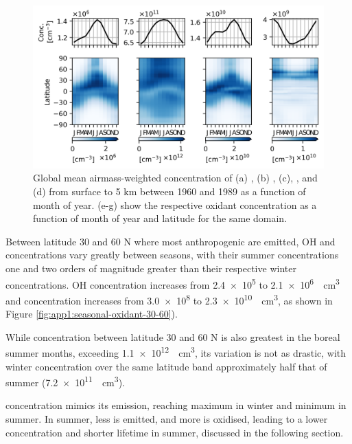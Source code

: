 \begin{figure}
    \centering
    \includegraphics{Chapter4/Figs/seasonal_oxidant_pothole.png}
    \caption[Mean concentration of , , , and  from surface to 5 km between 1960 and 1989]{Global mean airmass-weighted concentration of (a) , (b) , (c), , and (d)  from surface to 5 km between 1960 and 1989 as a function of month of year. (e-g) show the respective oxidant concentration as a function of month of year and latitude for the same domain.}
    \label{fig:ch4:seasonal-oxidants}
\end{figure}

Between latitude 30 and 60 \textdegree N where most anthropogenic  are emitted, OH and  concentrations vary greatly between seasons, with their summer concentrations one and two orders of magnitude greater than their respective winter concentrations. OH concentration increases from \num{2.4e5} to \qty{2.1e6}{\per\cubic\cm} and  concentration increases from \num{3.0e8} to \qty{2.3e10}{\per\cubic\cm}, as shown in Figure \ref{fig:app1:seasonal-oxidant-30-60}). 

While  concentration between latitude 30 and 60 \textdegree N is also greatest in the boreal summer months, exceeding \qty{1.1e12}{\per\cubic\cm}, its variation is not as drastic, with winter concentration over the same latitude band approximately half that of summer (\qty{7.2e11}{\per\cubic\cm}).

 concentration mimics its emission, reaching maximum in winter and minimum in summer. In summer, less  is emitted, and more is oxidised, leading to a lower concentration and shorter lifetime in summer, discussed in the following section.

